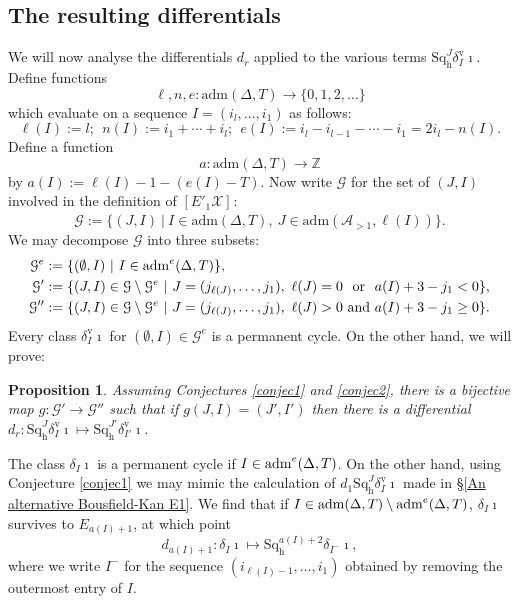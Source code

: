 \documentclass[11pt]{amsart} \renewcommand{\baselinestretch}{1.2}
\theoremstyle{plain}
\newtheorem{prop}[thm]{Proposition}
\numberwithin{equation}{section} %
\theoremstyle{plain}
\newtheorem{prop}[thm]{Proposition}
\numberwithin{equation}{chapter} %
\renewcommand{\to}{\longrightarrow}
\newcommand{\calA}{\mathcal{A}}
\newcommand{\calg}{\mathcal{G}}
\newcommand{\calx}{\mathcal{X}}
\newcommand{\LieSteen}{\calA}
\newcommand{\aDTnoplus}{\mathrm{adm}(\Delta,T)}
\newcommand{\aDTe}{\mathrm{adm}^{\smash{e}}(\Delta,T)}
\newcommand{\aS}[1]{\mathrm{adm}(\LieSteen_{>1},#1)}
\newcommand{\Eprime}[5]{[E'_{#2}#3]^{#4}_{#5}}
\newcommand{\uver}{^\mathrm{v}}
\newcommand{\dhor}{_\mathrm{h}}
\newcommand{\Sqh}{\mathrm{Sq}\dhor}
\newcommand{\deltav}{\delta\uver}
\renewcommand{\mapsto}{\longmapsto}
\newcommand{\SubsectionOrSection}[1]{\subsection{#1}}
\begin{document}
\begin{The Bousfield-Kan spectral sequence for a sphere}
\SubsectionOrSection{The resulting differentials}
\label{The resulting differentials}
We will now analyse the differentials $d_r$ applied to the various terms $\Sqh^J\deltav_I\imath$. Define functions
\[\ell,n,e:\aDTnoplus\to \{0,1,2,\ldots\}\]
which evaluate on a sequence $I=(i_l,\ldots,i_1)$ as follows:
\[\ell(I):=l;\ \ n(I):=i_1+\cdots +i_l;\ \ e(I):=i_l-i_{l-1}-\cdots -i_1=2i_l-n(I).\]
Define a function
\[a:\aDTnoplus \to \mathbb{Z}\]
by $a(I):=\ell(I)-1-(e(I)-T)$.  Now write $\calg$ for the set of $(J,I)$ involved in the definition of $\Eprime{blank}{1}{\calx}{}{}$:
\[\calg:=\{(J,I)\ |\ I\in \aDTnoplus,\ J\in \aS{\ell (I)}\}.\]
We may decompose $\calg$ into three subsets:%
\begin{alignat*}{2}
\calg^{e}
&:=
\{(\emptyset,I)\ |\ I\in \aDTe\},%
\\
\calg'
&:=
\{(J,I)\in\calg\setminus \calg^e\ |\ J=(j_{\ell(J)},\ldots,j_1),\ \ell(J)=0\textup{ \makebox[\widthof{and}][c]{or}\ }a(I)+3-j_1< 0\},%
\\
\calg''
&:=
\{(J,I)\in\calg\setminus \calg^e\ |\ J=(j_{\ell(J)},\ldots,j_1),\ \ell(J)>0\textup{ and\ }a(I)+3-j_1\geq 0\}.%
\end{alignat*}
Every class $\deltav_I\imath$ for $(\emptyset,I)\in\calg^e$ is a permanent cycle. On the other hand, we will prove:
\begin{prop}\label{thereisamap...}
Assuming Conjectures \ref{conjec1} and \ref{conjec2}, there is a bijective map $g:\calg'\to \calg''$ such that if $g(J,I)=(J',I')$ then there is a differential $d_r:\Sqh^J\deltav_I\imath\mapsto \Sqh^{J'}\deltav_{I'}\imath$.
\end{prop}


The class $\delta_I\imath$  is a permanent cycle if $I\in\aDTe$. On the other hand, 
using Conjecture \ref{conjec1} we may mimic the calculation of $d_1\Sqh^J\deltav_I\imath$ made in \S\ref{An alternative Bousfield-Kan E1}. We find that
if $I\in \aDTnoplus \setminus\aDTe$, $\delta_I\imath$  survives to $E_{a(I)+1}$, at which point
\begin{equation}\label{theBasicDiff}
d_{a(I)+1}:\delta_I\imath\mapsto\Sqh^{a(I)+2}\delta_{I^{-}}\imath,
\end{equation}
where we write $I^-$ for the sequence $(i_{\ell(I)-1},\ldots,i_1)$ obtained by removing the outermost entry of $I$.


\end{The Bousfield-Kan spectral sequence for a sphere}
\end{document}
